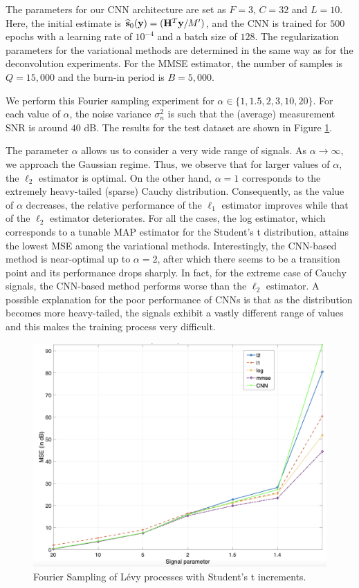 \documentclass[journal]{IEEEtran}
\begin{document}
The parameters for our CNN architecture are set as $F=3$, $C=32$ and $L=10$. Here, the initial estimate is $\widehat{{\bf{s}}}_{0}({\bf{y}}) = ({\bf{H}}^{T} {\bf{y}} / M')$, and the CNN is trained for $500$ epochs with a learning rate of $10^{-4}$ and a batch size of $128$. The regularization parameters for the variational methods are determined in the same way as for the deconvolution experiments. For the MMSE estimator, the number of samples is $Q=15,000$ and the burn-in period is $B=5,000$.

We perform this Fourier sampling experiment for $\alpha \in \{1, 1.5, 2, 3, 10, 20 \}$. For each value of $\alpha$, the noise variance $\sigma_n^{2}$ is such that the (average) measurement SNR is around $40$ dB. The results for the test dataset are shown in Figure \ref{fig:fourier_sampling_student}.

The parameter $\alpha$ allows us to consider a very wide range of signals. As $\alpha \rightarrow \infty$, we approach the Gaussian regime. Thus, we observe that for larger values of $\alpha$, the $\ell_2$ estimator is optimal. On the other hand, $\alpha=1$ corresponds to the extremely heavy-tailed (sparse) Cauchy distribution. Consequently, as the value of $\alpha$ decreases, the relative performance of the $\ell_1$ estimator improves while that of the $\ell_2$ estimator deteriorates. For all the cases, the log estimator, which corresponds to a tunable MAP estimator for the Student's t distribution, attains the lowest MSE among the variational methods. Interestingly, the CNN-based method is near-optimal up to $\alpha = 2$, after which there seems to be a transition point and its performance drops sharply. In fact, for the extreme case of Cauchy signals, the CNN-based method performs worse than the $\ell_2$ estimator. A possible explanation for the poor performance of CNNs is that as the distribution becomes more heavy-tailed, the signals exhibit a vastly different range of values and this makes the training process very difficult.    

\begin{figure}[t]
    \centering
    \includegraphics[width=\linewidth]{figures/fourier_sampling_student}
    \caption{Fourier Sampling of L\'{e}vy processes with Student's t increments.}
    \label{fig:fourier_sampling_student}
\end{figure}
\end{document}
